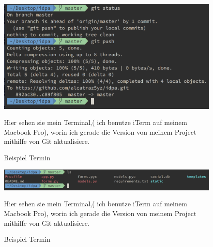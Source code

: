 \documentclass{article}
\begin{document}
        \begin{figure}[ht]
            \centering
            \includegraphics[width=.8\linewidth]{cli-git}
            \caption{Beispiel Termin}
            \label{fig:sub1}{Hier sehen sie mein Terminal,(
            ich benutze iTerm auf meinem Macbook Pro),
            worin ich gerade
            die Version von meinem Project mithilfe von Git aktualisiere.}
            \end{figure}

            \begin{figure}[ht]
                \centering
                \includegraphics[width=.9\linewidth]{cli-ls}
                \caption{Beispiel Termin}
                \label{fig:sub1}{Hier sehen sie mein Terminal,(
                ich benutze iTerm auf meinem Macbook Pro),
                worin ich gerade
                die Version von meinem Project mithilfe von Git aktualisiere.}
                \end{figure}
\end{document}
